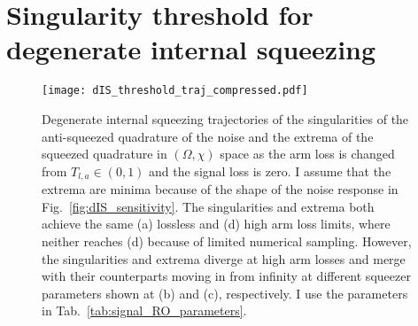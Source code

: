 \chapter{Singularity threshold for degenerate internal squeezing}
\label{app:dIS_singularity_thr}

\begin{figure}[h!]
    \centering
    \texttt{[image: dIS\_threshold\_traj\_compressed.pdf]}
    \caption{Degenerate internal squeezing trajectories of the singularities of the anti-squeezed quadrature of the noise and the extrema of the squeezed quadrature in $(\Omega, \chi)$ space as the arm loss is changed from $T_{l,a}\in(0,1)$ and the signal loss is zero. I assume that the extrema are minima because of the shape of the noise response in Fig.~\ref{fig:dIS_sensitivity}.
    The singularities and extrema both achieve the same (a) lossless and (d) high arm loss limits, where neither reaches (d) because of limited numerical sampling. However, the singularities and extrema diverge at high arm losses and merge with their counterparts moving in from infinity at different squeezer parameters shown at (b) and (c), respectively. I use the parameters in Tab.~\ref{tab:signal_RO_parameters}. %
    }
    \label{fig:dIS_threshold_traj} %
\end{figure}

